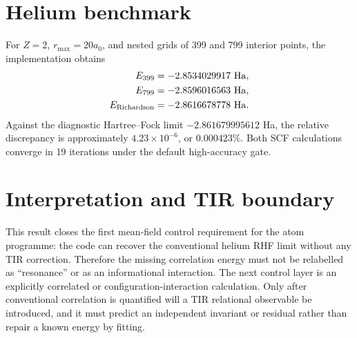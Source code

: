 \section{Helium benchmark}
For $Z=2$, $r_{\max}=20a_0$, and nested grids of 399 and 799 interior points, the implementation obtains
\begin{align}
E_{399} &= -2.8534029917\ {\rm Ha},\\
E_{799} &= -2.8596016563\ {\rm Ha},\\
E_{\rm Richardson} &= -2.8616678778\ {\rm Ha}.
\end{align}
Against the diagnostic Hartree--Fock limit $-2.861679995612$ Ha, the relative discrepancy is approximately $4.23\times10^{-6}$, or $0.000423\%$. Both SCF calculations converge in 19 iterations under the default high-accuracy gate.

\section{Interpretation and TIR boundary}
This result closes the first mean-field control requirement for the atom programme: the code can recover the conventional helium RHF limit without any TIR correction. Therefore the missing correlation energy must not be relabelled as ``resonance'' or as an informational interaction. The next control layer is an explicitly correlated or configuration-interaction calculation. Only after conventional correlation is quantified will a TIR relational observable be introduced, and it must predict an independent invariant or residual rather than repair a known energy by fitting.
